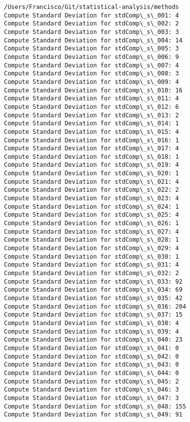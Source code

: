 \documentclass[11pt]{article}
\begin{document}
    \begin{Verbatim}[commandchars=\\\{\}]
/Users/Francisco/Git/statistical-analysis/methods
Compute Standard Deviation for stdComp\_s\_001: 4
Compute Standard Deviation for stdComp\_s\_002: 2
Compute Standard Deviation for stdComp\_s\_003: 3
Compute Standard Deviation for stdComp\_s\_004: 14
Compute Standard Deviation for stdComp\_s\_005: 3
Compute Standard Deviation for stdComp\_s\_006: 9
Compute Standard Deviation for stdComp\_s\_007: 4
Compute Standard Deviation for stdComp\_s\_008: 3
Compute Standard Deviation for stdComp\_s\_009: 4
Compute Standard Deviation for stdComp\_s\_010: 16
Compute Standard Deviation for stdComp\_s\_011: 4
Compute Standard Deviation for stdComp\_s\_012: 6
Compute Standard Deviation for stdComp\_s\_013: 2
Compute Standard Deviation for stdComp\_s\_014: 1
Compute Standard Deviation for stdComp\_s\_015: 4
Compute Standard Deviation for stdComp\_s\_016: 1
Compute Standard Deviation for stdComp\_s\_017: 4
Compute Standard Deviation for stdComp\_s\_018: 1
Compute Standard Deviation for stdComp\_s\_019: 4
Compute Standard Deviation for stdComp\_s\_020: 1
Compute Standard Deviation for stdComp\_s\_021: 4
Compute Standard Deviation for stdComp\_s\_022: 2
Compute Standard Deviation for stdComp\_s\_023: 4
Compute Standard Deviation for stdComp\_s\_024: 1
Compute Standard Deviation for stdComp\_s\_025: 4
Compute Standard Deviation for stdComp\_s\_026: 1
Compute Standard Deviation for stdComp\_s\_027: 4
Compute Standard Deviation for stdComp\_s\_028: 1
Compute Standard Deviation for stdComp\_s\_029: 4
Compute Standard Deviation for stdComp\_s\_030: 1
Compute Standard Deviation for stdComp\_s\_031: 4
Compute Standard Deviation for stdComp\_s\_032: 2
Compute Standard Deviation for stdComp\_s\_033: 92
Compute Standard Deviation for stdComp\_s\_034: 69
Compute Standard Deviation for stdComp\_s\_035: 42
Compute Standard Deviation for stdComp\_s\_036: 204
Compute Standard Deviation for stdComp\_s\_037: 15
Compute Standard Deviation for stdComp\_s\_038: 4
Compute Standard Deviation for stdComp\_s\_039: 4
Compute Standard Deviation for stdComp\_s\_040: 23
Compute Standard Deviation for stdComp\_s\_041: 0
Compute Standard Deviation for stdComp\_s\_042: 0
Compute Standard Deviation for stdComp\_s\_043: 0
Compute Standard Deviation for stdComp\_s\_044: 0
Compute Standard Deviation for stdComp\_s\_045: 2
Compute Standard Deviation for stdComp\_s\_046: 3
Compute Standard Deviation for stdComp\_s\_047: 3
Compute Standard Deviation for stdComp\_s\_048: 155
Compute Standard Deviation for stdComp\_s\_049: 91

\end{Verbatim}
\end{document}
